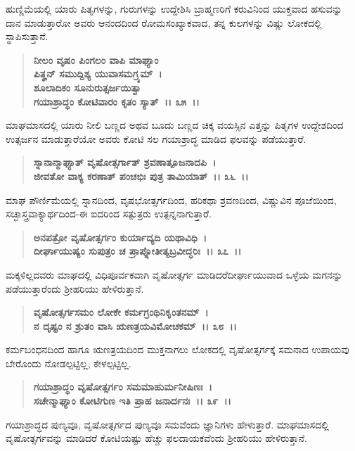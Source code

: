 ಹುಣ್ಣಿಮೆಯಲ್ಲಿ ಯಾರು ಪಿತೃಗಳನ್ನು, ಗುರುಗಳನ್ನು ಉದ್ದೇಶಿಸಿ ಬ್ರಾಹ್ಮಣರಿಗೆ ಕರುವಿ\-ನಿಂದ ಯುಕ್ತವಾದ ಹಸುವನ್ನು ದಾನ ಮಾಡುತ್ತಾರೋ ಅವರು ಆನಂದದಿಂದ ರೋಮ\-ಸಂಖ್ಯಾಕವಾದ, ತನ್ನ ಕುಲಗಳನ್ನು ವಿಷ್ಣು ಲೋಕದಲ್ಲಿ ಸ್ಥಾಪಿಸುತ್ತಾನೆ.

\begin{verse}
\textbf{ನೀಲಂ ವೃಷಂ ಪಿಂಗಲಂ ವಾಪಿ ಮಾಘ್ಯಾಂ} \\\textbf{ಪಿತೄನ್ ಸಮುದ್ದಿಶ್ಯ ಯುವಾಸಮಗ್ರ್ಯಮ್~।}\\\textbf{ಶೂಲಾದಿಕಂ ಸೂನುರುತ್ಸರ್ಜಯಿತ್ವಾ} \\\textbf{ಗಯಾಶ್ರಾದ್ಧಂ ಕೋಟಿವಾರಂ ಕೃತಂ ಸ್ಯಾತ್~।। ೩೫~।।}
\end{verse}

ಮಾಘಮಾಸದಲ್ಲಿ ಯಾರು ನೀಲಿ ಬಣ್ಣದ ಅಥವ ಬೂದು ಬಣ್ಣದ ಚಿಕ್ಕ ವಯಸ್ಸಿನ ಎತ್ತನ್ನು ಪಿತೃಗಳ ಉದ್ದೇಶದಿಂದ ಉತ್ಸರ್ಜನ ಮಾಡುತ್ತಾರೆಯೋ ಅವರು ಕೋಟಿ ಸಲ ಗಯಾಶ್ರಾದ್ಧ ಮಾಡಿದ ಫಲವನ್ನು ಪಡೆಯುತ್ತಾರೆ.

\begin{verse}
\textbf{ಸ್ನಾನಾನ್ಮಾಘ್ಯಾತ್ ವೃಷೋತ್ಸರ್ಗಾತ್ ಶ್ರವಣಾತ್ಪೂಜನಾದಪಿ~।}\\\textbf{ಜೀವತೋ ವಾಕ್ಯ ಕರಣಾತ್ ಪಂಚಭಿಃ ಪುತ್ರ ತಾಮಿಯಾತ್~।। ೩೬~।।}
\end{verse}

ಮಾಘ ಪೌರ್ಣಿಮೆಯಲ್ಲಿ ಸ್ನಾನದಿಂದ, ವೃಷಭೋತ್ಸರ್ಗದಿಂದ, ಹರಿಕಥಾ ಶ್ರವಣದಿಂದ, ವಿಷ್ಣುವಿನ ಪೂಜೆಯಿಂದ, ಸಚ್ಛಾಸ್ತ್ರವಾಕ್ಯಾರ್ಥದಿಂದ-ಈ ಐದರಿಂದ ಸತ್ಪುತ್ರರು ಉತ್ಪನ್ನ\-ನಾಗುತ್ತಾರೆ.

\begin{verse}
\textbf{ಅನಪತ್ರೋ ವೃಷೋತ್ಸರ್ಗಂ ಕುರ್ಯಾದ್ಯದಿ ಯಥಾವಿಧಿ~।}\\\textbf{ದೀರ್ಘಾಯುಷ್ಯಂ ಸುಪುತ್ರಂ ಚ ಪ್ರಾಪ್ನೋತೀತ್ಯಬ್ರವೀದ್ಧರಿಃ~।। ೩೭~।।}
\end{verse}

ಮಕ್ಕಳಿಲ್ಲದವರು ಮಾಘದಲ್ಲಿ ವಿಧಿಪೂರ್ವಕವಾಗಿ ವೃಷೋತ್ಸರ್ಗ ಮಾಡಿದರೆ\break ದೀರ್ಘಾಯುವಾದ ಒಳ್ಳೆಯ ಮಗನನ್ನು ಪಡೆಯುತ್ತಾರೆಂದು ಶ‍್ರೀಹರಿಯು ಹೇಳಿರುತ್ತಾನೆ.

\begin{verse}
\textbf{ವೃಷೋತ್ಸರ್ಗಸಮಂ ಲೋಕೇ ಕರ್ಮಗ್ರಂಥಿನಿಕೃಂತನಮ್~।}\\\textbf{ನ ದೃಷ್ಟಂ ನ ಶ್ರುತಂ ವಾಸಿ ಋಣತ್ರಯವಿಮೋಚಕಮ್~।। ೩೮~।।}
\end{verse}

ಕರ್ಮಬಂಧನದಿಂದ ಹಾಗೂ ಋಣತ್ರಯದಿಂದ ಮುಕ್ತನಾಗಲು ಲೋಕದಲ್ಲಿ ವೃಷೋ\-ತ್ಸರ್ಗಕ್ಕೆ ಸಮನಾದ ಉಪಾಯವು ಬೇರೊಂದು ನೋಡಲ್ಪಟ್ಟಿಲ್ಲ, ಕೇಳಲ್ಪಟ್ಟಿಲ್ಲ.

\begin{verse}
\textbf{ಗಯಾಶ್ರಾದ್ಧಂ ವೃಷೋತ್ಸರ್ಗಂ ಸಮಮಾಹುರ್ಮನೀಷಿಣಃ~।}\\\textbf{ಸಚೇನ್ಮಾಘ್ಯಾಂ ಕೋಟಿಗುಣ ಇತಿ ಪ್ರಾಹ ಜನಾರ್ದನಃ~।। ೩೯~।।}
\end{verse}

ಗಯಾಶ್ರಾದ್ಧದ ಪುಣ್ಯವೂ, ವೃಷೋತ್ಸರ್ಗದ ಪುಣ್ಯವೂ ಸಮವೆಂದು ಜ್ಞಾನಿಗಳು ಹೇಳು\-ತ್ತಾರೆ. ಮಾಘಮಾಸದಲ್ಲಿ ವೃಷೋತ್ಸರ್ಗವನ್ನು ಮಾಡಿದರೆ ಕೋಟಿಯಷ್ಟು ಹೆಚ್ಚು ಫಲದಾಯಕವೆಂದು ಶ‍್ರೀಹರಿಯು ಹೇಳಿರುತ್ತಾನೆ.

